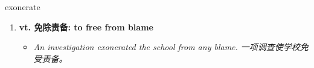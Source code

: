 
\begin{frame}
{\huge exonerate}
\begin{center}
\begin{enumerate}\Large
  \item \textbf{vt. 免除责备: to free from blame}
  \begin{itemize}
    \item \em{\Large{An investigation exonerated the school from any blame. 一项调查使学校免受责备。}}
  \end{itemize}
\end{enumerate}
\end{center}
\end{frame}
